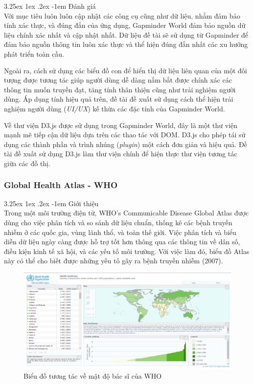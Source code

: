 \documentclass[12pt,a4paper,twoside]{article}
\makeatletter
\newcommand{\myparagraph}[1]{\paragraph{#1}\mbox{}\\} %
\renewcommand\paragraph{\@startsection{paragraph}{5}{\z@}%
  {3.25ex \@plus1ex \@minus.2ex}%
  {-1em}%
  {\normalfont\normalsize\bfseries}}
\makeatother
\begin{document}
\myparagraph{Đánh giá}
Với mục tiêu luôn luôn cập nhật các công cụ cũng như dữ liệu, nhằm đảm bảo tính xác thực, và đúng đắn của ứng dụng, Gapminder World đảm bảo nguồn dữ liệu chính xác nhất và cập nhật nhất.
Dữ liệu đề tài sẽ sử dụng từ Gapminder để đảm bảo nguồn thông tin luôn xác thực và thể hiện đúng đắn nhất các xu hướng phát triển toàn cầu.

Ngoài ra, cách sử dụng các biểu đồ con để hiển thị dữ liệu liên quan của một đối tượng được tương tác giúp người dùng dễ dàng nắm bắt được chính xác các thông tin muốn truyền đạt, tăng tính thân thiện cũng như trải nghiệm người dùng. Áp dụng tính hiệu quả trên, đề tài đề xuất sử dụng cách thể hiện trải nghiệm người dùng (\textit{UI/UX}) kế thừa các đặc tính của Gapminder World. 

Về thư viện D3.js được sử dụng trong Gapminder World, đây là một thư viện mạnh mẽ tiếp cận dữ liệu dựa trên các thao tác với DOM. D3.js cho phép tái sử dụng các thành phần và trình nhúng (\textit{plugin}) một cách đơn giản và hiệu quả. Đề tài đề xuất sử dụng D3.js làm thư viện chính để hiện thực thư viện tương tác giữa các đồ thị.
\subsubsection{Global Health Atlas - WHO}
\myparagraph{Giới thiệu}
Trong một môi trường điện tử, WHO’s Communicable Disease Global Atlas được dùng cho việc phân tích và so sánh dữ liệu chuẩn, thống kê các bệnh truyền nhiễm ở các quốc gia, vùng lãnh thổ, và toàn thế giới. Việc phân tích và biểu diễn dữ liệu ngày càng được hỗ trợ tốt hơn thông qua các thông tin về dân số, điều kiện kinh tế xã hội, và các yếu tố môi trường. Với việc làm đó, biểu đồ Atlas này có thể cho biết được những yếu tố gây ra bệnh truyền nhiễm (2007)\cite{gha}.
\begin{figure}[!h]
    \begin{center}
    \includegraphics[scale=.4]{image/globalatlas}
    \caption{Biểu đồ tương tác về mật độ bác sĩ của WHO}
    \label{fig:globalatlas}
    \end{center}
\end{figure}
\end{document}
